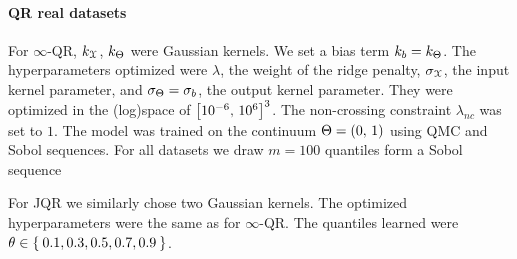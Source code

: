 %
\paragraph{\ac{QR} real datasets}
%
For $\infty$-\ac{QR}, $k_{\mathcal{X}}$, $k_{\Theta}$ were
Gaussian kernels. We set a bias term $k_b=k_{\Theta}$. The
hyperparameters optimized were $\lambda$, the weight of the ridge penalty,
$\sigma_\mathcal{X}$, the input kernel parameter, and
$\sigma_\Theta=\sigma_b$, the output kernel parameter. They were
optimized in the (log)space of $\left[10^{-6},\,10^{6}\right]^3$. The
non-crossing constraint $\lambda_{nc}$ was set to $1$. The model was trained on
the continuum $\Theta=\left(0,\,1\right)$ using QMC and Sobol sequences. For
all datasets we draw $m=100$ quantiles form a Sobol sequence \par
%
For \ac{JQR} we similarly chose two Gaussian kernels. The optimized
hyperparameters were the same as for $\infty$-\ac{QR}.
The quantiles learned were $\theta\in\Set{0.1, 0.3, 0.5, 0.7, 0.9}$.

